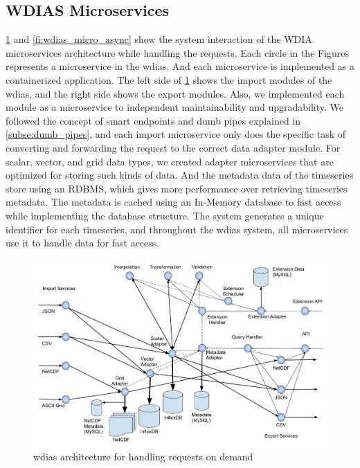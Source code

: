 \subsection{WDIAS Microservices}
\label{sebse:wdias_microservices}

\cref{fi:wdias_micro_on_demand} and \cref{fi:wdias_micro_async} show the system interaction of the WDIA microservices architecture while handling the requests. Each circle in the Figures represents a microservice in the \acrshort{wdias}. And each microservice is implemented as a containerized application. The left side of \cref{fi:wdias_micro_on_demand} shows the import modules of the \acrshort{wdias}, and the right side shows the export modules. Also, we implemented each module as a microservice to independent maintainability and upgradability. We followed the concept of smart endpoints and dumb pipes explained in \cref{subse:dumb_pipes}, and each import microservice only does the specific task of converting and forwarding the request to the correct data adapter module. For scalar, vector, and grid data types, we created adapter microservices that are optimized for storing such kinds of data. And the metadata data of the timeseries store using an RDBMS, which gives more performance over retrieving timeseries metadata. The metadata is cached using an In-Memory database to fast access while implementing the database structure. The system generates a unique identifier for each timeseries, and throughout the \acrshort{wdias} system, all microservices use it to handle data for fast access.

\begin{figure}[htp]
    \centering
    \includegraphics[width=1\textwidth]{method/microservice/microservice_architecture-handle_on_demand-v4.pdf}
    \caption{\acrshort{wdias} architecture for handling requests on demand}
    \label{fi:wdias_micro_on_demand}
\end{figure}

